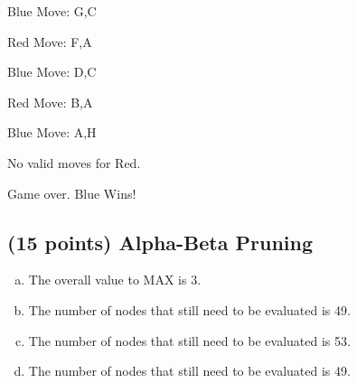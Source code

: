 \documentclass{article}
\begin{document}
	Blue Move: G,C
	
	Red Move: F,A
	
	Blue Move: D,C
	
	Red Move: B,A
	
	Blue Move:  A,H
	
	No valid moves for Red. 
	
	Game over. Blue Wins!
	\subsection{(15 points) Alpha-Beta Pruning}
	\begin{enumerate}[(a)]
		\item The overall value to MAX is 3. 
		\item The number of nodes that still need to be evaluated is 49.
		\item The number of nodes that still need to be evaluated is 53.
		\item The number of nodes that still need to be evaluated is 49.
	\end{enumerate}
	\setcounter{section}{2}
\end{document}
